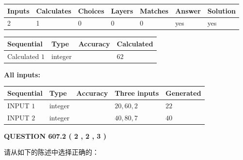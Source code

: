 \documentclass{ctexart}
\begin{document}
 
\noindent{}
 
 

 
   
   
   
   
\noindent\begin{tabular}{|l|l|l|l|l|l|l|}
 \hline
Inputs & Calculates & Choices & Layers & Matches & Answer & Solution \\ \hline
 2  & 
 1  & 
 0
  & 
 0  & 
 0  & 
  yes & 
  yes 
  \\ \hline
 \end{tabular}
   
   
   
   
\noindent{}
   
   
  
  
\noindent\begin{tabular}{|l|l|l|l|}
\hline
 Sequential & Type & Accuracy & Calculated \\ 
\hline
 
 
  Calculated $  1 $ & integer &  & 
  $ 62 $ 
 \\  \hline  
 \end{tabular}
   
   
   
   
\noindent\vspace{0.1in}\hspace{-0.08in} {\textbf{\Large{All inputs: }}}
   
   
  
  
\noindent\begin{tabular}{|l|l|l|l|l|}
\hline
 Sequential & Type & Accuracy & Three inputs & Generated \\ 
\hline
 
 
  INPUT $  1 $ & integer &  & $
 20
 , 
 60
 , 
 2
 $ & $ 22 $ 
 \\  \hline  
 
 
  INPUT $  2 $ & integer &  & $
 40
 , 
 80
 , 
 7
 $ & $ 40 $ 
 \\  \hline  
 \end{tabular}
   
   
  
\vspace{0.2in}
  
{\textbf{\Large{QUESTION
607.2 
 ( 2 , 2 , 3 )
}}}
  
  
请从如下的陈述中选择正确的：
 
\end{document}
